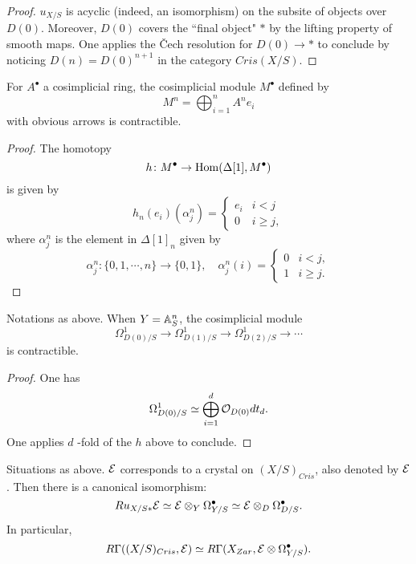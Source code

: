 \begin{proof}
    $u_{X/S}$ is acyclic (indeed, an isomorphism) 
    on the subsite of objects over $D(0)$. 
    Moreover, $D(0)$ covers the ``final object" $*$ 
    by the lifting property of smooth maps.
    One applies the \v Cech resolution for $D(0) \to *$ to conclude 
    by noticing $D(n) = D(0)^{n+1}$ in the category $Cris(X/S)$. 
\end{proof}

\begin{lemma}
    For $A^\bullet$ a cosimplicial ring, 
    the cosimplicial module $M^\bullet$ defined by
    \[
        M^n = \bigoplus_{i = 1}^n A^n e_i
    \]
    with obvious arrows is contractible.
\end{lemma}

\begin{proof}
    The homotopy
    \[
        h \colon M^\bullet \to \operatorname{Hom}(\Delta[1], M^\bullet)
    \]
    is given by 
    \[
        h_n (e_i) (\alpha_j^n) = \left\{
            \begin{array}{rr}
                e_i & i<j \\
                0   & i \geq j,
            \end{array}
        \right.
    \]
    where $\alpha_j^n$ is the element in $\Delta[1]_n$ given by 
    \[
        \alpha_j^n \colon \{0,1,\cdots,n\} \to \{0,1\}, 
        \quad \alpha_j^n(i) = \left\{
            \begin{array}{rr}
                0 & i<j, \\
                1 & i \geq j.
            \end{array}
        \right.
    \]
\end{proof}

\begin{lemma}
    \label{Poincare ii}
    Notations as above. 
    When $Y = {\mathbb {A}}^n_S$, the cosimplicial module 
    \[
        \Omega_{D(0)/S}^1 \to \Omega_{D(1)/S}^1 
        \to \Omega_{D(2)/S}^1 \to \cdots
    \]
    is contractible.
\end{lemma}

\begin{proof}
    One has
    \[
        \Omega_{D(0)/S}^1 \simeq 
        \bigoplus_{i=1}^d {\mathcal {O}}_{D(0)} dt_d.
    \]
    One applies $d$ -fold of the $h$ above to conclude.
\end{proof}

\begin{theorem}
    Situations as above. 
    ${\mathcal {E}}$ corresponds to a crystal on $(X/S)_{Cris}$, 
    also denoted by ${\mathcal {E}}$. 
    Then there is a canonical isomorphism:
    \[
        Ru_{X/S*} {\mathcal {E}} \simeq {\mathcal {E}} \otimes_Y \Omega_{Y/S}^\bullet 
        \simeq {\mathcal {E}} \otimes_D \Omega_{D/S}^\bullet.
    \]
    In particular,
    \[
        R \Gamma ((X/S)_{Cris},{\mathcal {E}}) \simeq 
        R \Gamma (X_{Zar}, {\mathcal {E}} \otimes \Omega_{Y/S}^\bullet). 
    \]
\end{theorem}

